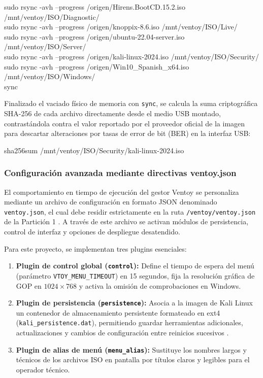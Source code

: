 \documentclass[12pt]{article}
\begin{document}
\begin{mdframed}[style=terminal]
\ttfamily\upshape\color{bashLetterColor}\footnotesize
sudo rsync -avh --progress /origen/Hirens.BootCD.15.2.iso /mnt/ventoy/ISO/Diagnostic/ \\
sudo rsync -avh --progress /origen/knoppix-8.6.iso /mnt/ventoy/ISO/Live/ \\
sudo rsync -avh --progress /origen/ubuntu-22.04-server.iso /mnt/ventoy/ISO/Server/ \\
sudo rsync -avh --progress /origen/kali-linux-2024.iso /mnt/ventoy/ISO/Security/ \\
sudo rsync -avh --progress /origen/Win10\_Spanish\_x64.iso /mnt/ventoy/ISO/Windows/ \\
sync
\end{mdframed}

Finalizado el vaciado físico de memoria con \texttt{sync}, se calcula la suma criptográfica SHA-256 de cada archivo directamente desde el medio USB montado, contrastándola contra el valor reportado por el proveedor oficial de la imagen para descartar alteraciones por tasas de error de bit (BER) en la interfaz USB:

\begin{mdframed}[style=terminal]
\ttfamily\upshape\color{bashLetterColor}\footnotesize
sha256sum /mnt/ventoy/ISO/Security/kali-linux-2024.iso
\end{mdframed}

\subsubsection{Configuración avanzada mediante directivas ventoy.json}

El comportamiento en tiempo de ejecución del gestor Ventoy se personaliza mediante un archivo de configuración en formato JSON denominado \texttt{ventoy.json}, el cual debe residir estrictamente en la ruta \texttt{/ventoy/ventoy.json} de la Partición 1 \parencite{ventoy2024plugins}. A través de este archivo se activan módulos de persistencia, control de interfaz y opciones de despliegue desatendido.

Para este proyecto, se implementan tres plugins esenciales:
\begin{enumerate}[noitemsep, topsep=2pt]
    \item \textbf{Plugin de control global (\texttt{control}):} Define el tiempo de espera del menú (parámetro \texttt{VTOY\_MENU\_TIMEOUT}) en 15 segundos, fija la resolución gráfica de GOP en $1024 \times 768$ y activa la omisión de comprobaciones en Windows.
    \item \textbf{Plugin de persistencia (\texttt{persistence}):} Asocia a la imagen de Kali Linux un contenedor de almacenamiento persistente formateado en ext4 (\texttt{kali\_persistence.dat}), permitiendo guardar herramientas adicionales, actualizaciones y cambios de configuración entre reinicios sucesivos \parencite{ventoy2024plugins}.
    \item \textbf{Plugin de alias de menú (\texttt{menu\_alias}):} Sustituye los nombres largos y técnicos de los archivos ISO en pantalla por títulos claros y legibles para el operador técnico.
\end{enumerate}
\end{document}
